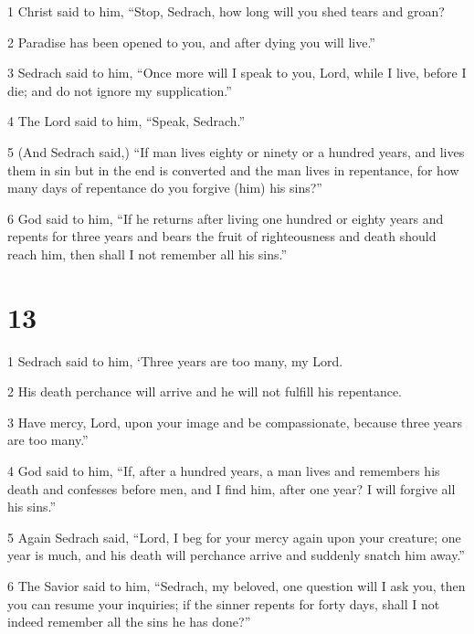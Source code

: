 \par 1 Christ said to him, “Stop, Sedrach, how long will you shed tears and groan?   

\par 2 Paradise has been opened to you, and after dying you will live.”

\par 3 Sedrach said to him, “Once more will I speak to you, Lord, while I live, before I die; and do not ignore my supplication.” 

\par 4 The Lord said to him, “Speak, Sedrach.” 

\par 5 (And Sedrach said,) “If man lives eighty or ninety or a hundred years, and lives them in sin but in the end is converted and the man lives in repentance, for how many days of repentance do you forgive (him) his sins?” 

\par 6 God said to him, “If he returns after living one hundred or eighty years and repents for three years and bears the fruit of righteousness and death should reach him, then shall I not remember all his sins.” 

\chapter{13}

\par 1 Sedrach said to him, ‘Three years are too many, my Lord. 

\par 2 His death perchance will arrive and he will not fulfill his repentance. 

\par 3 Have mercy, Lord, upon your image and be compassionate, because three years are too many.” 

\par 4 God said to him, “If, after a hundred years, a man lives and remembers his death and confesses before men, and I find him, after one year? I will forgive all his sins.” 

\par 5 Again Sedrach said, “Lord, I beg for your mercy again upon your creature; one year is much, and his death will perchance arrive and suddenly snatch him away.” 

\par 6 The Savior said to him, “Sedrach, my beloved, one question will I ask you, then you can resume your inquiries; if the sinner repents for forty days, shall I not indeed remember all the sins he has done?” 

